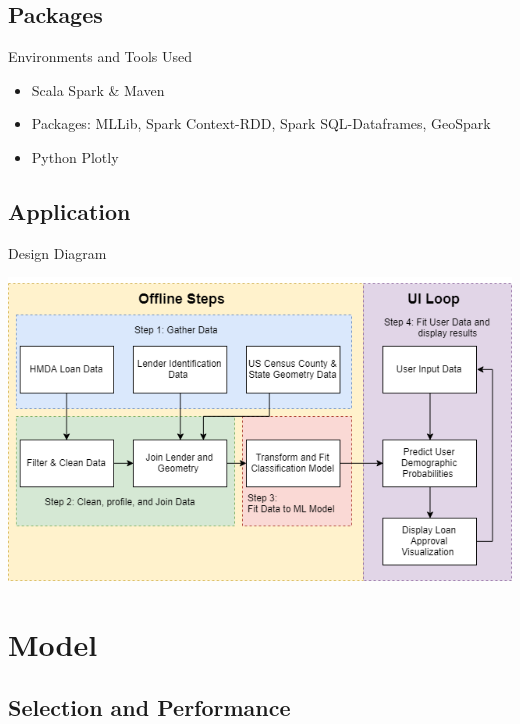 \documentclass{beamer}
\begin{document}
\subsection{Packages}

\begin{frame}{Environments and Tools Used}

\begin{itemize}
    \item Scala Spark \& Maven
    \item Packages: MLLib, Spark Context-RDD, Spark SQL-Dataframes, GeoSpark
    \item Python Plotly
\end{itemize}

\end{frame}

\subsection{Application}

\begin{frame}{Design Diagram}

\includegraphics[width=\linewidth]{SparkDesignDiagram.png}


\end{frame}

\section{Model}
\subsection{Selection and Performance}
\end{document}
